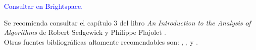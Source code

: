 \section*{}
\begin{center}
\end{center}
\begin{center}
    \textcolor{blue}{Consultar en Brightspace.}
\end{center}
Se recomienda consultar el capítulo 3 del libro \textit{An Introduction to the Analysis of Algorithms} de Robert Sedgewick y Philippe Flajolet \cite{sedgewick_introduction_2013}.\\
Otras fuentes bibliográficas altamente recomendables son: \cite{lehman_generating_2010}, \cite{knuth_art_nodate}, \cite{graham_concrete_1994} y \cite{wilf_chapter_1990}.



